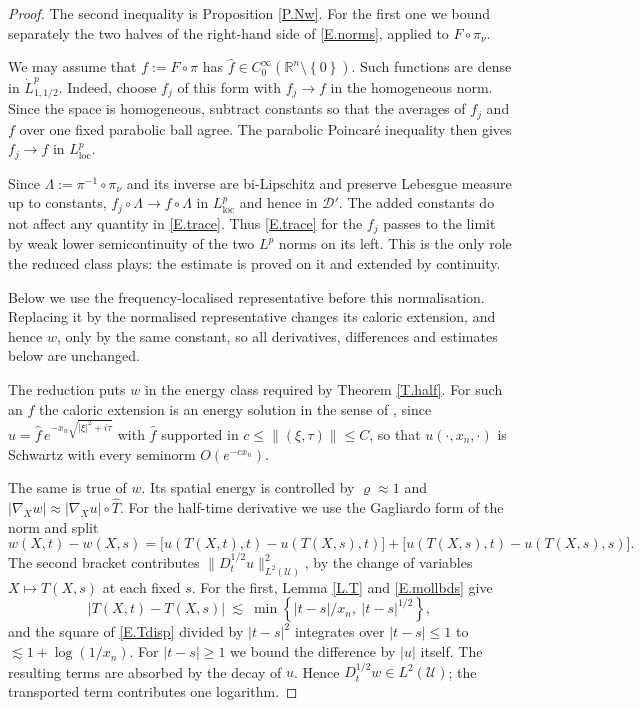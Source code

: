 \documentclass[10pt,a4paper]{amsart}
\numberwithin{equation}{section}
\DeclareMathOperator{\loc}{loc}
\newcommand{\R}{\mathbb R}
\newcommand{\wh}{\widehat}
\newcommand{\abs}[1]{\left\vert#1\right\vert}
\newcommand{\br}[1]{\left(#1\right)}
\newcommand{\set}[1]{\left\{#1\right\}}
\newcommand{\dhalf}{D_t^{1/2}}
\newcommand{\Uc}{\mathcal U}
\begin{document}
\begin{proof}
The second inequality is Proposition \ref{P.Nw}. For the first one we bound
separately the two halves of the right-hand side of \eqref{E.norms}, applied to
$F\circ\pi_\nu$.

\noindent We may assume that $f:=F\circ\pi$ has
$\wh f\in C^\infty_0(\R^n\setminus\set0)$. Such functions are dense in
$\dot L^p_{1,1/2}$. Indeed, choose $f_j$ of this form with
$f_j\to f$ in the homogeneous norm. Since the space is homogeneous, subtract
constants so that the averages of $f_j$ and $f$ over one fixed parabolic ball
agree. The parabolic Poincar\'e inequality then gives
$f_j\to f$ in $L^p_{\loc}$.

Since
$\Lambda:=\pi^{-1}\circ\pi_\nu$ and its inverse are bi-Lipschitz and preserve
Lebesgue measure up to constants, $f_j\circ\Lambda\to f\circ\Lambda$ in
$L^p_{\loc}$ and hence in $\mathcal D'$. The added constants do not affect any
quantity in \eqref{E.trace}. Thus \eqref{E.trace} for the $f_j$ passes to the
limit by weak lower semicontinuity of the two $L^p$ norms on its left. This is
the only role the reduced class plays: the estimate is proved on it and
extended by continuity.\medskip

\noindent Below we use the frequency-localised representative before this
normalisation. Replacing it by the normalised representative changes its
caloric extension, and hence $w$, only by the same constant, so all derivatives,
differences and estimates below are unchanged.

\noindent The reduction puts $w$ in the energy class required by Theorem
\ref{T.half}. For such an $f$ the caloric
extension is an energy solution in the sense of \cite[\S2]{DLPN}, since
$\wh u=\wh f\,e^{-x_n\sqrt{\abs\xi^2+i\tau}}$ with $\wh f$ supported in
$c\le\|(\xi,\tau)\|\le C$, so that $u(\cdot,x_n,\cdot)$ is Schwartz with every
seminorm $O(e^{-cx_n})$.

\noindent The same is true of $w$. Its spatial energy is controlled by
$\varrho\approx1$ and
$\abs{\nabla_Xw}\approx\abs{\nabla_Xu}\circ\widehat T$.
For the half-time derivative we use the Gagliardo form of the norm and split
$$w(X,t)-w(X,s)=\Big[u\br{T(X,t),t}-u\br{T(X,s),t}\Big]
  +\Big[u\br{T(X,s),t}-u\br{T(X,s),s}\Big] .$$
The second bracket contributes $\|\dhalf u\|^2_{L^2(\Uc)}$, by the change of
variables $X\mapsto T(X,s)$ at each fixed $s$. For the first, Lemma \ref{L.T}
and \eqref{E.mollbds} give
\begin{equation}\label{E.Tdisp}
  \abs{T(X,t)-T(X,s)}\ \lesssim\
  \min\set{\abs{t-s}/x_n,\ \abs{t-s}^{1/2}} ,
\end{equation}
and the square of \eqref{E.Tdisp} divided by $\abs{t-s}^2$ integrates over
$\abs{t-s}\le1$ to $\lesssim1+\log(1/x_n)$. For $\abs{t-s}\ge1$ we bound the
difference by $\abs u$ itself. The resulting terms are absorbed by the decay
of $u$. Hence $\dhalf w\in L^2(\Uc)$; the transported term contributes one
logarithm.\medskip


\end{proof}
\end{document}
